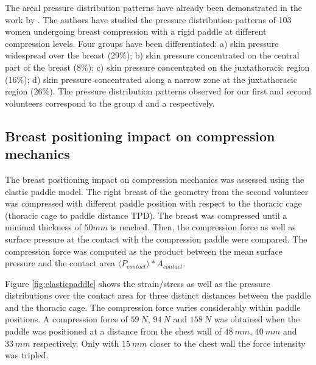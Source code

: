 \clearpage
The areal pressure distribution patterns have already been demonstrated in the work by \cite{dustler_breast_2012}. The authors have studied the pressure distribution patterns of 103 women undergoing breast compression with a rigid paddle at different compression levels. Four groups have been differentiated: a) skin pressure widespread over the breast (29\%); b) skin pressure concentrated on the central part of the breast (8\%); c) skin pressure concentrated on the juxtathoracic region (16\%); d) skin pressure concentrated along a narrow zone at the juxtathoracic region (26\%).  The pressure distribution patterns observed for our first and second volunteers correspond to the group d and a respectively.


\subsection{Breast positioning impact on compression mechanics}\label{subsection:breastpositioning}

The breast positioning impact on compression mechanics was assessed using the elastic paddle model. The right breast of the geometry from the second volunteer was compressed with different paddle position with respect to the thoracic cage (thoracic cage to paddle distance TPD). The breast was compressed until a minimal thickness of $50mm$ is reached. Then, the compression force as well as surface pressure at the contact with the compression paddle were compared. The compression force was computed as the product between the mean surface pressure and the contact area $\langle P_{contact}\rangle \ast  A_{contact}$.

Figure \ref{fig:elasticpaddle} shows the strain/stress as well as the pressure distributions over the contact area for three  distinct distances between the paddle and the thoracic cage. The compression force varies considerably within paddle positions. A compression force of $59\ N$, $94\ N$ and $158\ N$ was obtained when the paddle was positioned at a distance from the chest wall of $48\  mm$, $40\  mm$ and $33\ mm$ respectively. Only with $15\ mm$ closer to the chest wall the force intensity was tripled. 
 
